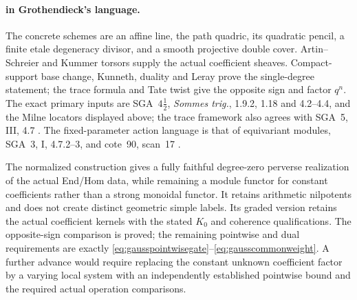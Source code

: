 \paragraph{ in Grothendieck's language.}
The concrete schemes are an affine line, the path quadric,
its quadratic pencil, a finite etale degeneracy divisor,
and a smooth projective double cover. Artin--Schreier
and Kummer torsors supply the actual coefficient sheaves.
Compact-support base change, Kunneth, duality and Leray
prove the single-degree statement; the trace formula and
Tate twist give the opposite sign and factor $q^n$.
The exact primary inputs are SGA~$4\frac12$,
\emph{Sommes trig.}, 1.9.2, 1.18 and 4.2--4.4, and
the Milne locators displayed above; the trace framework
also agrees with SGA~5, III, 4.7 \cite{SGA45,Milne,SGA5}.
The fixed-parameter action language is that of equivariant
modules, SGA~3, I, 4.7.2--3, and cote~90, scan~17
\cite{SGA3,Archive}.

The normalized construction gives a fully faithful
degree-zero perverse realization of the actual
 End/Hom data, while remaining a module functor
for constant coefficients rather than a strong monoidal
functor. It retains arithmetic nilpotents and does not
create distinct geometric simple labels. Its graded
version retains the actual  coefficient kernels
with the stated $K_0$ and coherence qualifications.
The opposite-sign comparison is proved; the remaining
pointwise and dual requirements are exactly
\eqref{eq:gausspointwisegate}--\eqref{eq:gausscommonweight}.
A further advance would require replacing the constant
unknown coefficient factor by a varying local system
with an independently established pointwise bound and
the required actual operation comparisons.

